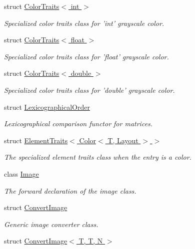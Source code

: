 \begin{DoxyCompactItemize}
struct \hyperlink{struct_d_o_1_1_color_traits_3_01int_01_4}{Color\-Traits$<$ int $>$}
\begin{DoxyCompactList}\small\item\em Specialized color traits class for 'int' grayscale color. \end{DoxyCompactList}\item 
struct \hyperlink{struct_d_o_1_1_color_traits_3_01float_01_4}{Color\-Traits$<$ float $>$}
\begin{DoxyCompactList}\small\item\em Specialized color traits class for 'float' grayscale color. \end{DoxyCompactList}\item 
struct \hyperlink{struct_d_o_1_1_color_traits_3_01double_01_4}{Color\-Traits$<$ double $>$}
\begin{DoxyCompactList}\small\item\em Specialized color traits class for 'double' grayscale color. \end{DoxyCompactList}\item 
struct \hyperlink{struct_d_o_1_1_lexicographical_order}{Lexicographical\-Order}
\begin{DoxyCompactList}\small\item\em Lexicographical comparison functor for matrices. \end{DoxyCompactList}\item 
struct \hyperlink{struct_d_o_1_1_element_traits_3_01_color_3_01_t_00_01_layout_01_4_01_4}{Element\-Traits$<$ Color$<$ T, Layout $>$ $>$}
\begin{DoxyCompactList}\small\item\em The specialized element traits class when the entry is a color. \end{DoxyCompactList}\item 
class \hyperlink{class_d_o_1_1_image}{Image}
\begin{DoxyCompactList}\small\item\em The forward declaration of the image class. \end{DoxyCompactList}\item 
struct \hyperlink{struct_d_o_1_1_convert_image}{Convert\-Image}
\begin{DoxyCompactList}\small\item\em Generic image converter class. \end{DoxyCompactList}\item 
struct \hyperlink{struct_d_o_1_1_convert_image_3_01_t_00_01_t_00_01_n_01_4}{Convert\-Image$<$ T, T, N $>$}

\end{DoxyCompactItemize}
